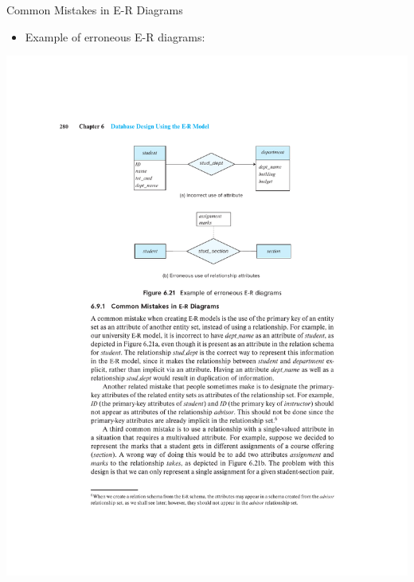 \documentclass{beamer}
\begin{document}
\begin{frame}{Common Mistakes in E-R Diagrams}
    \begin{itemize}
        \item Example of erroneous E-R diagrams:
    \end{itemize}
    \centering
    \includegraphics[trim={4cm 16cm 4cm 4cm}, clip, width=\textwidth]{figures/incorrect_use}
\end{frame}
\end{document}
